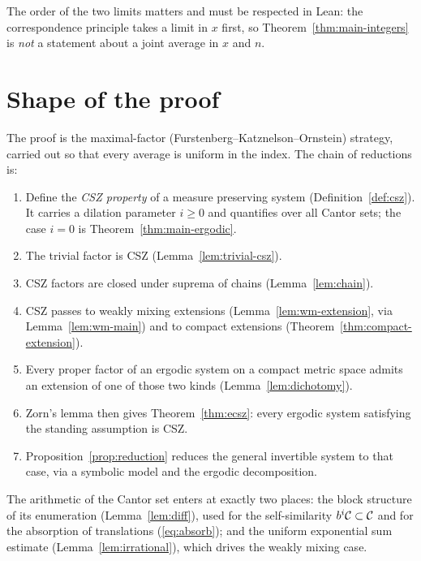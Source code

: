 \begin{remark}
  The order of the two limits matters and must be respected in Lean: the correspondence
  principle takes a limit in $x$ first, so Theorem~\ref{thm:main-integers} is \emph{not} a
  statement about a joint average in $x$ and $n$.
\end{remark}

\section{Shape of the proof}

The proof is the maximal-factor (Furstenberg--Katznelson--Ornstein) strategy, carried out so
that every average is uniform in the index.  The chain of reductions is:

\begin{enumerate}
  \item Define the \emph{CSZ property} of a measure preserving system
    (Definition~\ref{def:csz}).  It carries a dilation parameter $i \geq 0$ and quantifies over
    all Cantor sets; the case $i = 0$ is Theorem~\ref{thm:main-ergodic}.
  \item The trivial factor is CSZ (Lemma~\ref{lem:trivial-csz}).
  \item CSZ factors are closed under suprema of chains (Lemma~\ref{lem:chain}).
  \item CSZ passes to weakly mixing extensions (Lemma~\ref{lem:wm-extension}, via
    Lemma~\ref{lem:wm-main}) and to compact extensions (Theorem~\ref{thm:compact-extension}).
  \item Every proper factor of an ergodic system on a compact metric space admits an extension
    of one of those two kinds (Lemma~\ref{lem:dichotomy}).
  \item Zorn's lemma then gives Theorem~\ref{thm:ecsz}: every ergodic system satisfying the
    standing assumption is CSZ.
  \item Proposition~\ref{prop:reduction} reduces the general invertible system to that case,
    via a symbolic model and the ergodic decomposition.
\end{enumerate}

The arithmetic of the Cantor set enters at exactly two places: the block structure of its
enumeration (Lemma~\ref{lem:diff}), used for the self-similarity $b^i \mathcal{C} \subset \mathcal{C}$
and for the absorption of translations (\ref{eq:absorb}); and the uniform exponential sum
estimate (Lemma~\ref{lem:irrational}), which drives the weakly mixing case.

